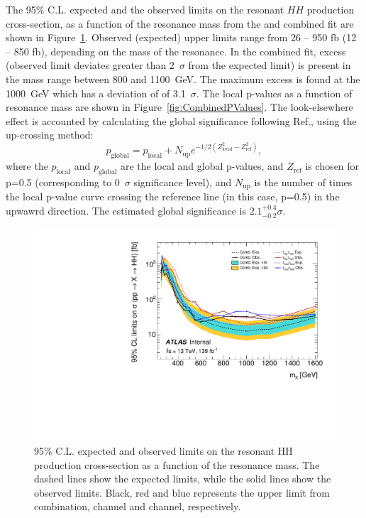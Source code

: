 The 95\% C.L. expected and the observed limits on the 
resonant $HH$ production cross-section, as a function of the resonance mass from the 
\lephad and \hadhad combined fit are shown in Figure~\ref{fig:CombinedLimits}.
Observed (expected) upper limits range from 26 -- 950 fb (12 -- 850 fb), 
depending on the mass of the resonance.
In the combined fit, excess (observed limit deviates greater than 2~$\sigma$ from the expected limit)
is present in the mass range between 800 and 1100~GeV. 
The maximum excess is found at the 1000~GeV which has a deviation of
of 3.1~$\sigma$. 
The local p-values as a function of resonance mass are shown in Figure~\ref{fig:CombinedPValues}.
The look-elsewhere effect is accounted by calculating the global significance
following Ref.\cite{global-significance}, using the up-crossing method:
\[ p_\text{global} = p_\text{local} +  N_\text{up} e^{-1/2(Z^2_\text{local} - Z^2_\text{ref})},
\]
where the $p_\text{local}$ and $p_\text{global}$ are the local and global p-values, and
$Z_\text{ref}$ is chosen for p=0.5 (corresponding to 0~$\sigma$ significance level), 
and $N_\text{up}$ is the number of times the local p-value curve crossing the reference line (in this case,
p=0.5) in the upwawrd direction.
The estimated global significance is $2.1^{+0.4}_{-0.2} \sigma$.


\begin{figure}[htbp]
\centering
\includegraphics[width=.8\textwidth]{figures/results/HH/Combined/CombSysts_21072021.pdf}
\caption{95\% C.L. expected and observed limits on the resonant HH production cross-section as a function of the resonance mass. 
The dashed lines show the expected limits, while the solid lines show the observed limits. 
Black, red and blue represents the upper limit from combination, \lephad channel and \hadhad channel, respectively.}
\label{fig:CombinedLimits}
\end{figure}


